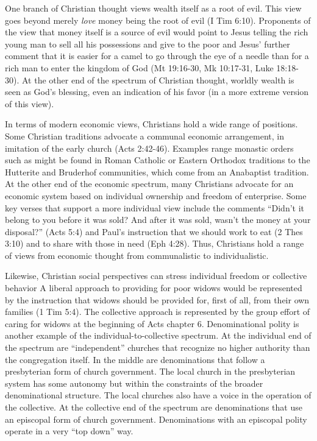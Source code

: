 \documentclass[12pt]{article}
\begin{document}
One branch of Christian thought views wealth itself as a root of evil. This view goes beyond merely \emph{love} money
being the root of evil (I Tim 6:10). Proponents of the view that money itself is a source of evil would point to Jesus
telling the rich young man to sell all his possessions and give to the poor and Jesus' further comment that it is easier
for a camel to go through the eye of a needle than for a rich man to enter the kingdom of God (Mt 19:16-30, Mk 10:17-31,
Luke 18:18-30). At the other end of the spectrum of Christian thought, worldly wealth is seen as God's blessing, even an
indication of his favor (in a more extreme version of this view).

In terms of modern economic views, Christians hold a wide range of positions. Some Christian traditions advocate a
communal economic arrangement, in imitation of the early church (Acts 2:42-46). Examples range monastic orders such as
might be found in Roman Catholic or Eastern Orthodox traditions to the Hutterite and Bruderhof communities, which come
from an Anabaptist tradition. At the other end of the economic spectrum, many Christians advocate for an economic system
based on individual ownership and freedom of enterprise. Some key verses that support a more individual view include the
comments ``Didn’t it belong to you before it was sold? And after it was sold, wasn’t the money at your disposal?'' (Acts
5:4) and Paul's instruction that we should work to eat (2 Thes 3:10) and to share with those in need (Eph 4:28).
Thus, Christians hold a range of views from economic thought from communalistic to individualistic.

Likewise, Christian social perspectives can stress individual freedom or collective behavior
A liberal approach to providing for poor widows would be represented by the instruction that widows should be 
provided for, first of all, from their own families (1 Tim 5:4). 
The collective approach is represented by the group effort of caring for widows at the beginning of Acts chapter 6.
Denominational polity is another example of the individual-to-collective spectrum.
At the individual end of the spectrum are ``independent'' churches that recognize no higher authority than the congregation itself.
In the middle are denominations that follow a presbyterian form of church 
government. The local church in the presbyterian system has some autonomy but within the constraints of the broader 
denominational structure. The local churches also have a voice in the operation of the collective. At the collective end of the spectrum 
are denominations that use an episcopal form of church government. Denominations with an episcopal polity operate in a very ``top down'' 
way.
\end{document}
